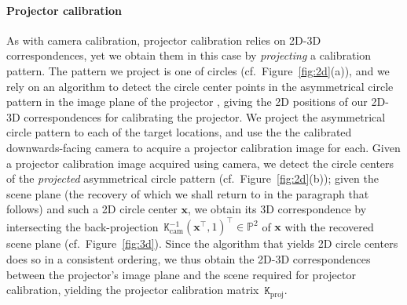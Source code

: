 \documentclass[review]{elsarticle}
\begin{document}
{\paragraph{Projector calibration} As with camera calibration, projector calibration relies on 2D-3D correspondences, yet we obtain them in this case by \textit{projecting} a calibration pattern. The pattern we project is one of circles (cf.\ Figure~\ref{fig:2d}(a)), and we rely on an algorithm to detect the circle center points in the asymmetrical circle pattern in the image plane of the projector \cite{bradski2000opencv}, giving the 2D positions of our 2D-3D correspondences for calibrating the projector. We project the asymmetrical circle pattern to each of the target locations, and use the the calibrated downwards-facing camera to acquire a projector calibration image for each. Given a projector calibration image acquired using camera, we detect the circle centers of the \textit{projected} asymmetrical circle pattern (cf.\ Figure~\ref{fig:2d}(b)); given the scene plane (the recovery of which we shall return to in the paragraph that follows) and such a 2D circle center $\mathbf{x}$, we obtain its 3D correspondence by intersecting the back-projection~$\mathtt{K}_\text{cam}^{-1}(\mathbf{x}^\top, 1)^\top \in \mathbb{P}^2$ of $\mathbf{x}$ with the recovered scene plane (cf.\ Figure~\ref{fig:3d}). Since the algorithm that yields 2D circle centers does so in a consistent ordering, we thus obtain the 2D-3D correspondences between the projector's image plane and the scene required for projector calibration, yielding the projector calibration matrix~$\mathtt{K}_\text{proj}$.

}
\end{document}
